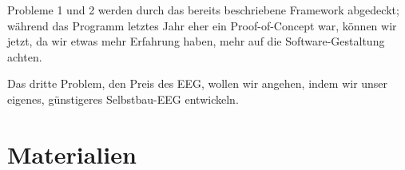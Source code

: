 \documentclass[10pt]{article}
\begin{document}
Probleme 1 und 2 werden durch das bereits beschriebene Framework abgedeckt; während das Programm letztes Jahr eher ein Proof-of-Concept war, können wir jetzt, da wir etwas mehr Erfahrung haben, mehr auf die Software-Gestaltung achten.

Das dritte Problem, den Preis des EEG, wollen wir angehen, indem wir unser eigenes, günstigeres Selbstbau-EEG entwickeln.

\newpage %

\section{Materialien} 

\begin{itemize}
    

\end{itemize}
\end{document}
